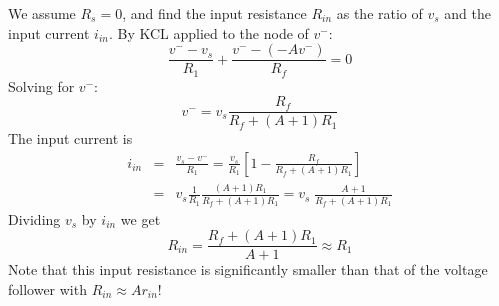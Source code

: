 \documentclass{article}
\begin{document}
\begin{itemize}
\begin{itemize}
      We assume $R_s=0$, and find the input resistance $R_{in}$ as the
      ratio of $v_s$ and the input current $i_{in}$. By KCL applied to 
      the node of $v^-$:
      \begin{equation}
        \frac{v^--v_s}{R_1}+\frac{v^--(-Av^-)}{R_f}=0 
      \end{equation}
      Solving for $v^-$:
      \begin{equation}
        v^-=v_s\frac{R_f}{R_f+(A+1)R_1} 
      \end{equation}
      The input current is
      \begin{eqnarray}
	i_{in}&=&\frac{v_s-v^-}{R_1}
        =\frac{v_s}{R_1}\left[1-\frac{R_f}{R_f+(A+1)R_1}\right]
	\nonumber \\
	&=&v_s\frac{1}{R_1}\frac{(A+1)R_1}{R_f+(A+1) R_1}
        =v_s\;\frac{A+1}{R_f+(A+1) R_1}
      \end{eqnarray}
      Dividing $v_s$ by $i_{in}$ we get
      \begin{equation}
        R_{in}=\frac{R_f+(A+1) R_1}{A+1}\approx R_1
      \end{equation}
      Note that this input resistance is significantly smaller
      than that of the voltage follower with $R_{in}\approx A r_{in}$!
      
    \begin{comment}
    \item {\bf Input resistance:} 

      We assume $R_s=0$, and find the input resistance $R_{in}$ as the
      ratio of $v_s$ and the input current $i_{in}$. By KCL applied to 
      the node of $v^-$:
      \begin{equation}
        \frac{v^--v_s}{R_1}+\frac{v^-}{r_{in}}+\frac{v^--(-Av^-)}{R_f+r_{out}}=0 
      \end{equation}
      Solving for $v^-$:
      \begin{equation}
        v^-=v_s\frac{r_{in}(R_f+r_{out})}{(R_1+r_{in})(R_f+r_{out})+(A+1)R_1r_{in}} 
      \end{equation}
      The input current is
      \begin{eqnarray}
	i_{in}&=&\frac{v_s-v^-}{R_1}
        =\frac{v_s}{R_1}\left[1-\frac{r_{in}(R_f+r_{out})}{(R_1+r_{in})(R_f+r_{out})
            +(A+1)R_1r_{in}}\right] 
	\nonumber \\
	&=&v_s\frac{R_f+r_{out}+(A+1)r_{in}}{(R_1+r_{in})(R_f+r_{out})+(A+1)R_1r_{in}} 
      \end{eqnarray}
      Dividing $v_s$ by $i_{in}$ we get
      \begin{eqnarray}
        R_{in}&=&\frac{v_s}{i_{in}}
        =\frac{[R_f+r_{out}+(A+1)R_1]r_{in}+R_1(R_f+r_{out})}{R_f+r_{out}+(A+1)r_{in}} 
        \nonumber\\
        &\approx&\frac{(R_f+A\,R_1)r_{in}+R_1R_f}{R_f+A\,r_{in}} 
        \approx \frac{A\,R_1\,r_{in}}{A\,r_{in}}=R_1 
      \end{eqnarray}
      The first approximation is based on $r_{out}\ll R_1,\,R_f$ and $A\gg 1$,
      the second approximation is based on $A\,r_{in}\gg R_1,\,R_f$.
    \end{comment}


\end{itemize}
\end{itemize}
\end{document}
